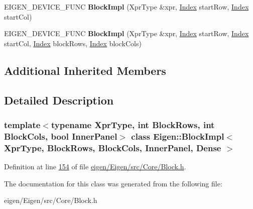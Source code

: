 \begin{DoxyCompactItemize}
\item 
\mbox{\label{class_eigen_1_1_block_impl_3_01_xpr_type_00_01_block_rows_00_01_block_cols_00_01_inner_panel_00_01_dense_01_4_a085388c41a4b03b1817ffb0c465c0433}} 
E\+I\+G\+E\+N\+\_\+\+D\+E\+V\+I\+C\+E\+\_\+\+F\+U\+NC {\bfseries Block\+Impl} (Xpr\+Type \&xpr, \hyperlink{namespace_eigen_a62e77e0933482dafde8fe197d9a2cfde}{Index} start\+Row, \hyperlink{namespace_eigen_a62e77e0933482dafde8fe197d9a2cfde}{Index} start\+Col)
\item 
\mbox{\label{class_eigen_1_1_block_impl_3_01_xpr_type_00_01_block_rows_00_01_block_cols_00_01_inner_panel_00_01_dense_01_4_abdea47b9ce5c0674cf046777e5769cc4}} 
E\+I\+G\+E\+N\+\_\+\+D\+E\+V\+I\+C\+E\+\_\+\+F\+U\+NC {\bfseries Block\+Impl} (Xpr\+Type \&xpr, \hyperlink{namespace_eigen_a62e77e0933482dafde8fe197d9a2cfde}{Index} start\+Row, \hyperlink{namespace_eigen_a62e77e0933482dafde8fe197d9a2cfde}{Index} start\+Col, \hyperlink{namespace_eigen_a62e77e0933482dafde8fe197d9a2cfde}{Index} block\+Rows, \hyperlink{namespace_eigen_a62e77e0933482dafde8fe197d9a2cfde}{Index} block\+Cols)
\end{DoxyCompactItemize}
\subsection*{Additional Inherited Members}


\subsection{Detailed Description}
\subsubsection*{template$<$typename Xpr\+Type, int Block\+Rows, int Block\+Cols, bool Inner\+Panel$>$\newline
class Eigen\+::\+Block\+Impl$<$ Xpr\+Type, Block\+Rows, Block\+Cols, Inner\+Panel, Dense $>$}



Definition at line \hyperlink{eigen_2_eigen_2src_2_core_2_block_8h_source_l00154}{154} of file \hyperlink{eigen_2_eigen_2src_2_core_2_block_8h_source}{eigen/\+Eigen/src/\+Core/\+Block.\+h}.



The documentation for this class was generated from the following file\+:\begin{DoxyCompactItemize}
\item 
eigen/\+Eigen/src/\+Core/\+Block.\+h\end{DoxyCompactItemize}
